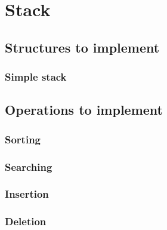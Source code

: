 \section{Stack}

\subsection{Structures to implement}

\subsubsection{Simple stack}


\subsection{Operations to implement}

\subsubsection{Sorting}

\subsubsection{Searching}

\subsubsection{Insertion}

\subsubsection{Deletion}

\newpage
